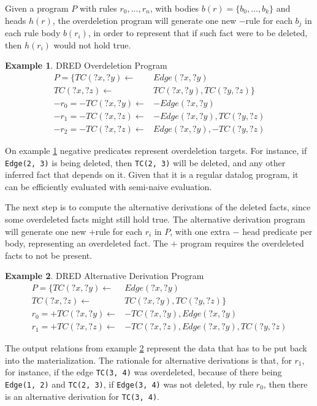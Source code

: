 \documentclass[sigconf,screen,review=false,natbib]{acmart}
\theoremstyle{definition}
\newtheorem{exmp}{Example}[section]
\begin{document}
Given a program $P$ with rules $r_0, ..., r_n$, with bodies $b(r) = \{b_0, ..., b_k\}$ and heads $h(r)$, the
overdeletion program will generate one new $-$rule for each $b_j$ in each rule body $b(r_i)$, in order to represent
that if such fact were to be deleted, then $h(r_i)$ would not hold true.
\begin{exmp}{DRED Overdeletion Program}
	\begin{align*}
		P = \{TC(?x, ?y) \leftarrow   & Edge(?x, ?y)              \\
		TC(?x, ?z) \leftarrow         & TC(?x, ?y), TC(?y, ?z) \} \\
		-r_0 = -TC(?x, ?y) \leftarrow & -Edge(?x, ?y)             \\
		-r_1 = -TC(?x, ?z) \leftarrow & -Edge(?x, ?y), TC(?y, ?z) \\
		-r_2 = -TC(?x, ?z) \leftarrow & Edge(?x, ?y), -TC(?y, ?z)
	\end{align*}
	\label{ex6}
\end{exmp}
On example \ref{ex6} negative predicates represent overdeletion targets. For instance, if \verb|Edge(2, 3)| is
being deleted, then \verb|TC(2, 3)| will be deleted, and any other inferred fact that depends on it. Given that
it is a regular datalog program, it can be efficiently evaluated with semi-naive evaluation.

The next step is to compute the alternative derivations of the deleted facts, since some overdeleted facts might
still hold true. The alternative derivation program will generate one new $+$rule for each $r_i$ in $P$, with
one extra $-$ head predicate per body, representing an overdeleted fact. The $+$ program requires the overdeleted
facts to not be present.
\begin{exmp}{DRED Alternative Derivation Program}
	\begin{align*}
		P = \{TC(?x, ?y) \leftarrow  & Edge(?x, ?y)                          \\
		TC(?x, ?z) \leftarrow        & TC(?x, ?y), TC(?y, ?z) \}             \\
		r_0 = +TC(?x, ?y) \leftarrow & -TC(?x, ?y), Edge(?x, ?y)             \\
		r_1 = +TC(?x, ?z) \leftarrow & -TC(?x, ?z), Edge(?x, ?y), TC(?y, ?z)
	\end{align*}
	\label{ex7}
\end{exmp}
The output relations from example \ref{ex7} represent the data that has to be put back into the materialization.
The rationale for alternative derivations is that, for $r_1$, for instance, if the edge \verb|TC(3, 4)| was
overdeleted, because of there being \verb|Edge(1, 2)| and \verb|TC(2, 3)|, if \verb|Edge(3, 4)| was not deleted, by
rule $r_0$, then there is an alternative derivation for \verb|TC(3, 4)|.
\end{document}
